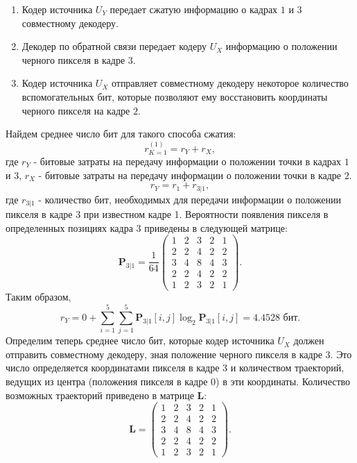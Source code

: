 \begin{enumerate}
\begin{enumerate}
\item Кодер источника $U_Y$ передает сжатую информацию о кадрах $1$ и $3$ совместному декодеру.
\item Декодер по обратной связи передает кодеру $U_X$ информацию о положении черного пикселя в кадре $3$.
\item Кодер источника $U_X$ отправляет совместному декодеру некоторое количество вспомогательных бит, которые позволяют ему восстановить координаты черного пикселя на кадре $2$.
\end{enumerate}
Найдем среднее число бит для такого способа сжатия:
\begin{equation*}
r_{K=1}^{(1)} = r_Y + r_X,
\end{equation*}
где $r_Y$ - битовые затраты на передачу информации о положении точки в кадрах $1$ и $3$, $r_X$ - битовые затраты на передачу информации о положении точки в кадре $2$.
\begin{equation*}
r_Y = r_1 + r_{3 \vert 1},
\end{equation*}
где $r_{3 \vert 1}$ - количество бит, необходимых для передачи информации о положении пикселя в кадре 3 при известном кадре 1. Вероятности появления пикселя в определенных позициях кадра 3 приведены в следующей матрице:
\begin{equation*}
\mathbf{P}_{3 \vert 1} = \frac{1}{64}
\begin{pmatrix}
1 & 2 & 3 & 2 & 1 \\
2 & 2 & 4 & 2 & 2 \\
3 & 4 & 8 & 4 & 3 \\
2 & 2 & 4 & 2 & 2 \\
1 & 2 & 3 & 2 & 1
\end{pmatrix}.
\end{equation*}
Таким образом,
\begin{equation*}
r_Y = 0 + \sum\limits_{i=1}^{5}\sum\limits_{j=1}^{5}\mathbf{P}_{3 \vert 1}[i,j]\log_2 \mathbf{P}_{3 \vert 1}[i,j] = 4.4528\text{ бит}.
\end{equation*}
Определим теперь среднее число бит, которые кодер источника $U_X$ должен отправить совместному декодеру, зная положение черного пикселя в кадре $3$. Это число определяется координатами пикселя в кадре $3$ и количеством траекторий, ведущих из центра (положения пикселя в кадре $0$) в эти координаты. Количество возможных траекторий приведено в матрице $\mathbf{L}$:
\begin{equation*}
\mathbf{L} =
\begin{pmatrix}
1 & 2 & 3 & 2 & 1 \\
2 & 2 & 4 & 2 & 2 \\
3 & 4 & 8 & 4 & 3 \\
2 & 2 & 4 & 2 & 2 \\
1 & 2 & 3 & 2 & 1
\end{pmatrix}.
\end{equation*}


\end{enumerate}
